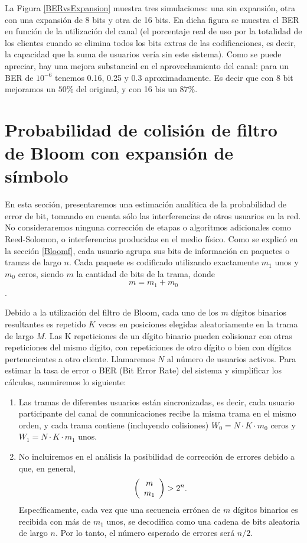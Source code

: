 La Figura \ref{BERvsExpansion} muestra tres simulaciones: una sin expansión, otra con una expansión de 8 bits y otra de 16 bits. En dicha figura se muestra el BER en función de la utilización del canal (el porcentaje real de uso por la totalidad de los clientes cuando se elimina todos los bits extras de las codificaciones, es decir, la capacidad que la suma de usuarios vería sin este sistema). Como se puede apreciar, hay una mejora substancial en el aprovechamiento del canal: para un BER de $10^{-6}$ tenemos 0.16, 0.25 y 0.3 aproximadamente. Es decir que con 8 bit mejoramos un $50\%$ del original, y con 16 bis un $87\%$.


\section{Probabilidad de colisión de filtro de Bloom con expansión de símbolo}

En esta sección, presentaremos una estimación analítica de la probabilidad de error de bit, tomando en cuenta sólo las interferencias de otros usuarios en la red.
No consideraremos ninguna corrección de etapas o algoritmos adicionales como Reed-Solomon, o interferencias producidas en el medio físico.
Como se explicó en la sección \ref{Bloomf}, cada usuario agrupa sus bits de información en paquetes o tramas de largo $n$. Cada paquete es codificado utilizando exactamente $m_{1}$ unos y $m_{0}$ ceros, siendo $m$ la cantidad de bits de la trama, donde $$m=m_{1}+m_{0}$$.

Debido a la utilización del filtro de Bloom, cada uno de los $m$ dígitos binarios resultantes es repetido $K$ veces en posiciones elegidas aleatoriamente en la trama de largo $M$. Las K repeticiones de un dígito binario pueden colisionar con otras repeticiones del mismo dígito, con repeticiones de otro dígito o bien con dígitos pertenecientes a otro cliente.
Llamaremos $N$ al número de usuarios activos. Para estimar la tasa de error o BER (Bit Error Rate) del sistema y simplificar los cálculos, asumiremos lo siguiente:

\begin{enumerate}
 \item Las tramas de diferentes usuarios están sincronizadas, es decir, cada usuario participante del canal de comunicaciones recibe la misma trama en el mismo orden, y cada trama contiene (incluyendo colisiones) $W_0 = N\cdot K\cdot m_0$ ceros y $W_1 = N\cdot K\cdot m_1$ unos.
 \item No incluiremos en el análisis la posibilidad de corrección de errores debido a que, en general, 
 \begin{equation}
\left(\begin{array}{c} m \\ m_1\end{array}\right) > 2^n.
\end{equation}
Específicamente, cada vez que una secuencia errónea de $m$ dígitos binarios es recibida con más de $m_1$ unos, se decodifica como una cadena de bits aleatoria de largo $n$.
Por lo tanto, el número esperado de errores será $n/2$.
\end{enumerate}

